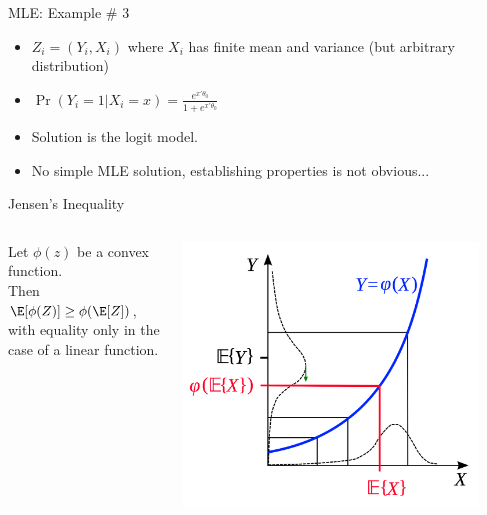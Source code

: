 \documentclass[aspectratio=169,11pt]{beamer}
\begin{document}
\begin{frame}{MLE: Example \# 3}
\begin{itemize}
\item $Z_i = (Y_i, X_i)$ where  $X_i$ has finite mean and variance (but arbitrary distribution)
\item $\Pr(Y_i=1 | X_i =x) =  \frac{e^{x' \theta_0}}{1+ e^{x'\theta_0}}$
\item Solution is the \alert{logit} model.
\item No simple MLE solution, establishing properties is not obvious...
\end{itemize}
\end{frame}

\begin{frame}{Jensen's Inequality}
\begin{columns}[T]
\begin{column}{.4\textwidth}
Let $\phi(z)$ be a convex function.\\ 
\vspace{2cm}
Then $\E[\phi(Z)] \geq \phi(\E [Z])$, with equality only in the case of a linear function.
\end{column}
\hfill
\begin{column}{.6\textwidth}
\begin{center}
 \includegraphics[width=0.9\textwidth]{resources/jensen.png}
\end{center}
\end{column}
\end{columns}



\end{frame}
\end{document}
